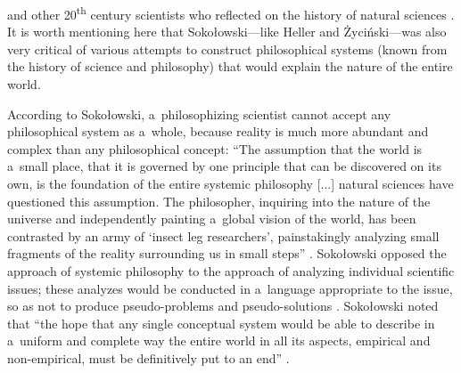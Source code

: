 \documentclass[%
  manuscript=article,
  year=2024,
  volume=77,
  doi=10.59203/zfn.77.689,
]{zfn}
\begin{document}
\parencite[][]{Heller1992BFilozofia} %
 and other 20\textsuperscript{th} century scientists who reflected on the history of natural sciences 
\parencites[][]{Wilson2011Konsiliencja}[][]{Schrodinger2017Przyroda}. %
 It is worth mentioning here that Sokołowski---like Heller and Życiński---was also very critical of various attempts to construct philosophical systems (known from the history of science and philosophy) that would explain the nature of the entire world.



According to Sokołowski, a~philosophizing scientist cannot accept any philosophical system as a~whole, because reality is much more abundant and complex than any philosophical concept: ``The assumption that the world is a~small place, that it is governed by one principle that can be discovered on its own, is the foundation of the entire systemic philosophy [...] natural sciences have questioned this assumption. The philosopher, inquiring into the nature of the universe and independently painting a~global vision of the world, has been contrasted by an army of ‘insect leg researchers', painstakingly analyzing small fragments of the reality surrounding us in small steps''
\parencite[][p.45]{Sokoowski1989Gos}. %
 Sokołowski opposed the approach of systemic philosophy to the approach of analyzing individual scientific issues; these analyzes would be conducted in a~language appropriate to the issue, so as not to produce pseudo-problems and pseudo-solutions 
\parencite[][p.207]{Sokoowski1986Pluralizm}. %
 Sokołowski noted that ``the hope that any single conceptual system would be able to describe in a~uniform and complete way the entire world in all its aspects, empirical and non-empirical, must be definitively put to an end'' 
\parencite[][]{Sokoowski1986Pluralizm}.%
\end{document}
